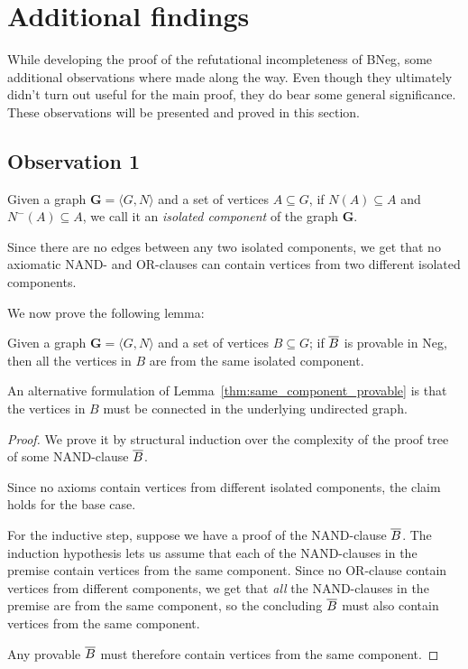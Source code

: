 \section{Additional findings}
\label{sec:Additional findings}
While developing the proof of the refutational incompleteness of BNeg, some additional observations where made along the way.
Even though they ultimately didn't turn out useful for the main proof, they do bear some general significance.
These observations will be presented and proved in this section.

\subsection{Observation 1}
\label{sub:Observation 1}
Given a graph $\mathbf{G} = \langle G,N \rangle$ and a set of vertices $A \subseteq G$, if $N(A) \subseteq A$ and $N^-(A) \subseteq A$, we call it an \textit{isolated component} of the graph $\mathbf{G}$.

Since there are no edges between any two isolated components, we get that no axiomatic NAND- and OR-clauses can contain vertices from two different isolated components.

We now prove the following lemma:
\begin{lemma}
  Given a graph $\mathbf{G} = \langle G,N \rangle$ and a set of vertices $B \subseteq G$; if $\ol{B}$ is provable in Neg, then all the vertices in $B$ are from the same isolated component.
  \label{thm:same_component_provable}
\end{lemma}
An alternative formulation of Lemma~\ref{thm:same_component_provable} is that the vertices in $B$ must be connected in the underlying undirected graph.
\begin{proof}
  We prove it by structural induction over the complexity of the proof tree of some NAND-clause $\ol{B}$.

  Since no axioms contain vertices from different isolated components, the claim holds for the base case.

  For the inductive step, suppose we have a proof of the NAND-clause $\ol{B}$.
  The induction hypothesis lets us assume that each of the NAND-clauses in the premise contain vertices from the same component.
  Since no OR-clause contain vertices from different components, we get that \textit{all} the NAND-clauses in the premise are from the same component, so the concluding $\ol{B}$ must also contain vertices from the same component.

  Any provable $\ol{B}$ must therefore contain vertices from the same component.
\end{proof}
